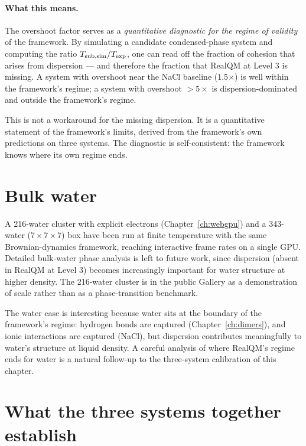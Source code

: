\paragraph{What this means.}
The overshoot factor serves as a \emph{quantitative diagnostic for the regime of validity} of the framework. By simulating a candidate condensed-phase system and computing the ratio $T_{\rm sub,sim} / T_{\rm exp}$, one can read off the fraction of cohesion that arises from dispersion --- and therefore the fraction that RealQM at Level 3 is missing. A system with overshoot near the NaCl baseline (1.5$\times$) is well within the framework's regime; a system with overshoot $> 5\times$ is dispersion-dominated and outside the framework's regime.

This is not a workaround for the missing dispersion. It is a quantitative statement of the framework's limits, derived from the framework's own predictions on three systems. The diagnostic is self-consistent: the framework knows where its own regime ends.

\section{Bulk water}\label{sec:bulk-water}

A 216-water cluster with explicit electrons (Chapter~\ref{ch:webgpu}) and a 343-water ($7 \times 7 \times 7$) box have been run at finite temperature with the same Brownian-dynamics framework, reaching interactive frame rates on a single GPU. Detailed bulk-water phase analysis is left to future work, since dispersion (absent in RealQM at Level 3) becomes increasingly important for water structure at higher density. The 216-water cluster is in the public Gallery as a demonstration of scale rather than as a phase-transition benchmark.

The water case is interesting because water sits at the boundary of the framework's regime: hydrogen bonds are captured (Chapter~\ref{ch:dimers}), and ionic interactions are captured (NaCl), but dispersion contributes meaningfully to water's structure at liquid density. A careful analysis of where RealQM's regime ends for water is a natural follow-up to the three-system calibration of this chapter.

\section{What the three systems together establish}\label{sec:condensed-summary}

